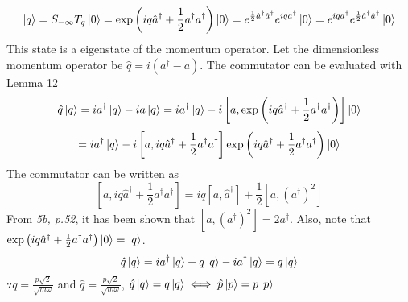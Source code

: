 \begin{sol}
\begin{enumerate}[label=\textbf{(\alph*)}]
    $$\ket q = S_{-\infty}T_q\ket 0=\exp\left(iq\hat a^\dagger+\frac{1}{2}a^\dagger a^\dagger\right)\ket0=e^{\frac{1}{2}\hat a^\dagger\hat a^\dagger}e^{iqa^\dagger}\ket 0=e^{iqa^\dagger}e^{\frac{1}{2}\hat a^\dagger\hat a^\dagger}\ket{0}$$
    This state is a eigenstate of the momentum operator. Let the dimensionless momentum operator be $\hat q = i(a^\dagger-a)$. The commutator can be evaluated with Lemma 12
    $$\hat q\ket q=ia^\dagger \ket q-ia\ket q=ia^\dagger \ket q-i\left[a, \exp\left(iq\hat a^\dagger+\frac{1}{2}a^\dagger a^\dagger\right)\right]\ket 0$$
    $$=ia^\dagger \ket q-i\left[a, iq\hat a^\dagger+\frac{1}{2}a^\dagger a^\dagger\right]\exp\left(iq\hat a^\dagger+\frac{1}{2}a^\dagger a^\dagger\right)\ket 0$$
    The commutator can be written as
    $$\left[a, iq\hat a^\dagger+\frac{1}{2}a^\dagger a^\dagger\right]=iq[a,\hat a^\dagger]+\frac{1}{2}[a, (a^\dagger)^2]$$
    From \textit{5b, p.52}, it has been shown that $[a, (a^\dagger)^2]=2a^\dagger$. Also, note that $\exp\left(iq\hat a^\dagger+\frac{1}{2}a^\dagger a^\dagger\right)\ket 0=\ket q$. 
    $$\hat q\ket q=ia^\dagger \ket q+q\ket q-ia^\dagger \ket q=q\ket q$$
   	$\because q=\frac{p\sqrt{2}}{\sqrt{m\omega}}$ and $\hat q = \frac{p\sqrt{2}}{\sqrt{m\omega}}$, $\hat q\ket q=q\ket q\iff\hat p\ket p=p\ket p$
\end{enumerate}
\end{sol}